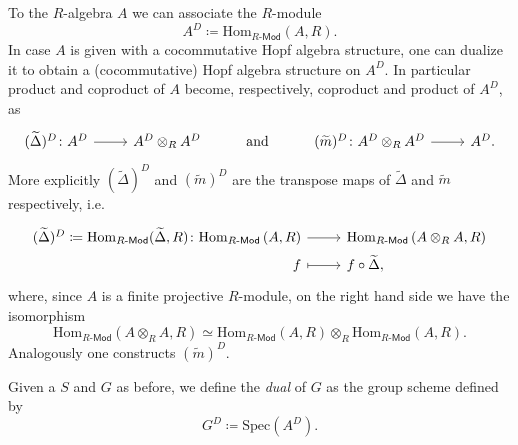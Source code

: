 \begin{rem}\label{rem:dualHopfStructure}
	To the $R$-algebra $A$ we can associate the $R$-module 
	\begin{equation*}
	A^D \coloneqq \mathrm{Hom}_{ R\text{-}\mathsf{Mod} } \left( A, R \right)
	.\end{equation*} 
	In case $A$ is given with a cocommutative Hopf algebra structure, one
	can dualize it to obtain a (cocommutative) Hopf algebra structure on $A^D$.
	In particular product and coproduct of $A$ become, respectively,
	coproduct and product of $A^D$, as
	\begin{equation*}
	\begin{tikzcd}
		(\widetilde{\Delta})^D\colon
		A^D \arrow[r, "", rightarrow] &
		A^D \otimes_R A^D &
		\text{\text{and}} &
		(\widetilde{m})^D\colon
		A^D \otimes_R A^D \arrow[r, "", rightarrow] &
		A^D 
	.\end{tikzcd}
	\end{equation*}
	More explicitly $(\widetilde{\Delta})^D$ and $(\widetilde{m})^D$ are
	the transpose maps of $\widetilde{\Delta}$ and $\widetilde{m}$ respectively,
	i.e.
	\begin{equation*}
	\begin{tikzcd}[row sep = 0ex
		,/tikz/column 1/.append style={anchor=base east}
		,/tikz/column 2/.append style={anchor=base west}]
		(\widetilde{\Delta})^D \coloneqq \mathrm{Hom}_{ R\text{-}\mathsf{Mod} }
		( \widetilde{\Delta}, R )
		\colon \mathrm{Hom}_{ R\text{-}\mathsf{Mod} } \left( A, R \right)\arrow[r, "", rightarrow] &
		\mathrm{Hom}_{ R\text{-}\mathsf{Mod} } \left( A \otimes_R A, R \right)\\
		f \arrow[r, "", mapsto] & f \circ \widetilde{\Delta}
	,\end{tikzcd}
	\end{equation*} 
	where, since $A$ is a finite projective $R$-module, 
	on the right hand side we have the isomorphism
	\begin{equation*}
	\mathrm{Hom}_{ R\text{-}\mathsf{Mod} } \left( A \otimes_R A, R \right) \simeq
	\mathrm{Hom}_{ R\text{-}\mathsf{Mod} } \left( A, R \right) \otimes_R
	\mathrm{Hom}_{ R\text{-}\mathsf{Mod} } \left( A, R \right)
	.\end{equation*}
	Analogously one constructs $(\widetilde{m})^D$.
\end{rem}


\begin{defn}
	Given a $S$ and $G$ as before, we define the {\em dual} of $G$ as the
	group scheme defined by
	\begin{equation*}
	G^D \coloneqq \mathrm{Spec}(A^D)
	.\end{equation*}
\end{defn}


